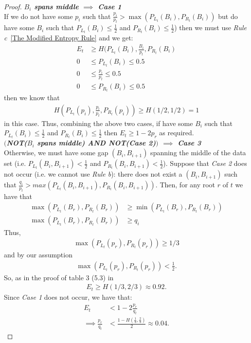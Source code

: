 \documentclass[]{beamer}
\theoremstyle{plain}
\begin{document}
\begin{frame}
\begin{proof}
\noindent\textbf{\textit{$B_i$ spans middle $\implies$ Case 1}} \\
If we do not have some $p_i$ such that $\frac{p_i}{p_t} > \max(P_{L_t}(B_i), P_{R_t}(B_i))$ but do have some $B_i$ such that $P_{L_t}(B_i) \leq \frac{1}{2}$ and $P_{R_t}(B_i) \leq \frac{1}{2}$) then we must use \textit{Rule c}~\ref{The Modified Entropy Rule} and we get:
\begin{align*}
 E_t &\geq H(P_{L_t}(B_i), \frac{B_i}{p_t} , P_{R_t}(B_i) \\
 0 &\leq P_{L_t}(B_i) \leq 0.5 \\
 0 &\leq \frac{p_i}{p_t} \leq 0.5 \\
 0 &\leq P_{R_t}(B_i) \leq 0.5
\end{align*} 
   then we know that \\
\begin{align*}
H(P_{L_t}(p_i), \frac{p_i}{p_t} , P_{R_t}(p_i)) \geq H(1/2, 1/2) = 1
\end{align*}
in this case.
 Thus, combining the above two cases, if have some $B_i$ such that $P_{L_t}(B_i) \leq \frac{1}{2}$ and $P_{R_t}(B_i) \leq \frac{1}{2}$ then $E_t \geq 1-2p_r$ as required. \\

\noindent\textbf{\textit{$\big($NOT($B_i$ spans middle) AND NOT(Case 2)$\big)$ $\implies$ Case 3}} \\
Otherwise, we must have some gap $(B_i, B_{i+1})$ spanning the middle of the data set (i.e. $P_{L_t}(B_i, B_{i+1}) < \frac{1}{2}$ and $P_{R_t}(B_i, B_{i+1}) < \frac{1}{2}$). Suppose that \textit{Case 2} does not occur (i.e. we cannot use \textit{Rule b}): there does not exist a $(B_i, B_{i+1})$ such that $\frac{q_i}{p_t} > max(P_{L_t}(B_i, B_{i+1}), P_{R_t}(B_i, B_{i+1}))$. Then, for any root $r$ of $t$ we have that \\
\begin{align*}
\max(P_{L_t}(B_r), P_{R_t}(B_r)) &\geq \min(P_{L_t}(B_r), P_{R_t}(B_r))\\ 
\max(P_{L_t}(B_r), P_{R_t}(B_r)) &\geq q_i
\end{align*}
Thus,
\begin{align*}
\max(P_{L_t}(p_r), P_{R_t}(p_r)) \geq 1/3
\end{align*}
 and by our assumption 
\begin{align*}
\max(P_{L_t}(p_r), P_{R_t}(p_r)) < \frac{1}{2}.
\end{align*}
 So, as in the proof of table 3 (5.3) in \cite{guttler1980binary}\\
\begin{align*}
E_t \geq H(1/3, 2/3) \approx 0.92.
\end{align*}
 Since \textit{Case 1} does not occur, we have that:
\begin{align*}
E_t &< 1-2\frac{p_r}{q_t} \\
\implies \frac{p_r}{q_t} &< \frac{1-H(\frac{1}{3}, \frac{2}{3})}{2} \approx 0.04.
\end{align*}


\end{proof}
\end{frame}
\end{document}
